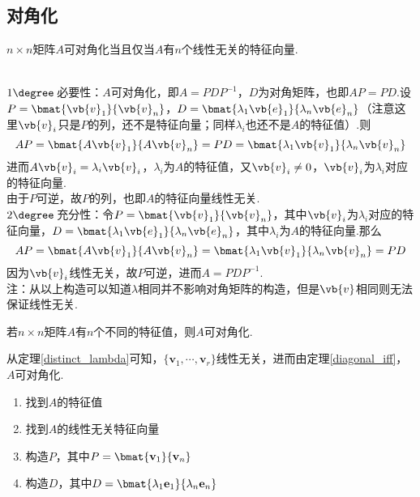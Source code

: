 \subsection{对角化}
\begin{theorem}
\label{diagonal_iff}
$n\times n$矩阵$A$可对角化当且仅当$A$有$n$个线性无关的特征向量.
\end{theorem}
\begin{analysis}\mbox{}\\
$1\degree\,$必要性：$A$可对角化，即$A=PDP^{-1}$，$D$为对角矩阵，也即$AP=PD$.设$P=\bmat{\vb{v}_1}{\vb{v}_n}$，$D=\bmat{\lambda_1\vb{e}_1}{\lambda_n\vb{e}_n}$（注意这里$\vb{v}_i$只是$P$的列，还不是特征向量；同样$\lambda_i$也还不是$A$的特征值）.则
\[AP=\bmat{A\vb{v}_1}{A\vb{v}_n}=PD=\bmat{\lambda_1\vb{v}_1}{\lambda_n\vb{v}_n}\]
进而$A\vb{v}_i=\lambda_i\vb{v}_i$，$\lambda_i$为$A$的特征值，又$\vb{v}_i\ne 0$，$\vb{v}_i$为$\lambda_i$对应的特征向量.\\
由于$P$可逆，故$P$的列，也即$A$的特征向量线性无关.\\
$2\degree\,$充分性：令$P=\bmat{\vb{v}_1}{\vb{v}_n}$，其中$\vb{v}_i$为$\lambda_i$对应的特征向量，$D=\bmat{\lambda_1\vb{e}_1}{\lambda_n\vb{e}_n}$，其中$\lambda_i$为$A$的特征向量.那么\\
\[AP=\bmat{A\vb{v}_1}{A\vb{v}_n}=\bmat{\lambda_1\vb{v}_1}{\lambda_n\vb{v}_n}=PD\]
因为$\vb{v}_i$线性无关，故$P$可逆，进而$A=PDP^{-1}$.\\
注：从以上构造可以知道$\lambda$相同并不影响对角矩阵的构造，但是$\vb{v}$相同则无法保证线性无关.
\end{analysis}
\begin{theorem}
若$n\times n$矩阵$A$有$n$个不同的特征值，则$A$可对角化.
\end{theorem}
\begin{analysis}
从定理\ref{distinct_lambda}可知，$\{\mathbf{v}_1,\cdots,\mathbf{v}_r\}$线性无关，进而由定理\ref{diagonal_iff}，$A$可对角化.
\end{analysis}
\begin{myalgorithm}[对角化]\mbox{}\par
\begin{enumerate}
	\itemsep -3pt
	\item 找到$A$的特征值
	\item 找到$A$的线性无关特征向量
	\item 构造$P$，其中$P=\bmat{\mathbf{v}_1}{\mathbf{v}_n}$
	\item 构造$D$，其中$D=\bmat{\lambda_1\mathbf{e}_1}{\lambda_n\mathbf{e}_n}$
\end{enumerate}
\end{myalgorithm}
